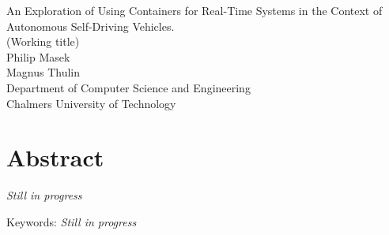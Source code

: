 An Exploration of Using Containers for Real-Time Systems in the Context of Autonomous Self-Driving Vehicles.\\
(Working title)\\
Philip Masek\\
Magnus Thulin\\
Department of Computer Science and Engineering\\
Chalmers University of Technology \setlength{\parskip}{0.5cm}

\thispagestyle{plain}			%
\setlength{\parskip}{0pt plus 1.0pt}
\section*{Abstract}
\textit{Still in progress}

\vfill
Keywords: \textit{Still in progress}

\newpage				%
\thispagestyle{empty}
\mbox{}